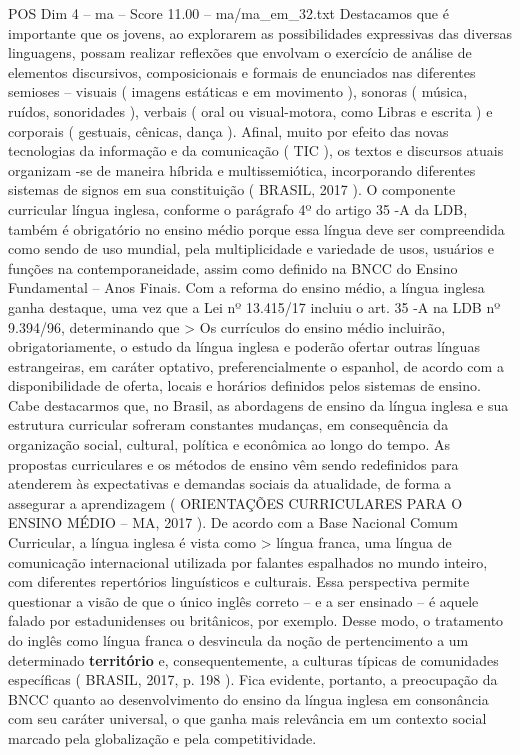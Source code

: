 \begin{textsample}{POS Dim 4 – ma – Score 11.00 – ma/ma\_em\_32.txt}
Destacamos que é importante que os jovens, ao explorarem as possibilidades expressivas das diversas linguagens, possam realizar reflexões que envolvam o exercício de análise de elementos discursivos, composicionais e formais de enunciados nas diferentes semioses – visuais ( imagens estáticas e em movimento ), sonoras ( música, ruídos, sonoridades ), verbais ( oral ou visual-motora, como Libras e escrita ) e corporais ( gestuais, cênicas, dança ).
Afinal, muito por efeito das novas tecnologias da informação e da comunicação ( TIC ), os textos e discursos atuais organizam -se de maneira híbrida e multissemiótica, incorporando diferentes sistemas de signos em sua constituição ( BRASIL, 2017 ).
O componente curricular língua inglesa, conforme o parágrafo 4º do artigo 35 -A da LDB, também é obrigatório no ensino médio porque essa língua deve ser compreendida como sendo de uso mundial, pela multiplicidade e variedade de usos, usuários e funções na contemporaneidade, assim como definido na BNCC do Ensino Fundamental – Anos Finais.
Com a reforma do ensino médio, a língua inglesa ganha destaque, uma vez que a Lei nº 13.415/17 incluiu o art. 35 -A na LDB nº 9.394/96, determinando que > Os currículos do ensino médio incluirão, obrigatoriamente, o estudo da língua inglesa e poderão ofertar outras línguas estrangeiras, em caráter optativo, preferencialmente o espanhol, de acordo com a disponibilidade de oferta, locais e horários definidos pelos sistemas de ensino.
Cabe destacarmos que, no Brasil, as abordagens de ensino da língua inglesa e sua estrutura curricular sofreram constantes mudanças, em consequência da organização social, cultural, política e econômica ao longo do tempo.
As propostas curriculares e os métodos de ensino vêm sendo redefinidos para atenderem às expectativas e demandas sociais da atualidade, de forma a assegurar a aprendizagem ( ORIENTAÇÕES CURRICULARES PARA O ENSINO MÉDIO – MA, 2017 ).
De acordo com a Base Nacional Comum Curricular, a língua inglesa é vista como > língua franca, uma língua de comunicação internacional utilizada por falantes espalhados no mundo inteiro, com diferentes repertórios linguísticos e culturais.
Essa perspectiva permite questionar a visão de que o único inglês correto – e a ser ensinado – é aquele falado por estadunidenses ou britânicos, por exemplo.
Desse modo, o tratamento do inglês como língua franca o desvincula da noção de pertencimento a um determinado \textbf{território} e, consequentemente, a culturas típicas de comunidades específicas ( BRASIL, 2017, p. 198 ).
Fica evidente, portanto, a preocupação da BNCC quanto ao desenvolvimento do ensino da língua inglesa em consonância com seu caráter universal, o que ganha mais relevância em um contexto social marcado pela globalização e pela competitividade.

\end{textsample}
